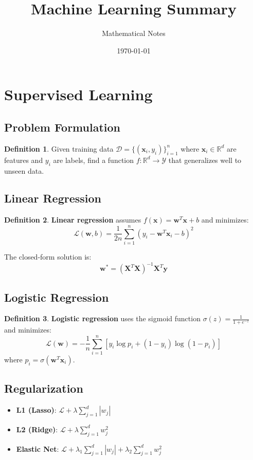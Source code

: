\documentclass[11pt]{article}
\title{Machine Learning Summary}
\author{Mathematical Notes}
\date{\today}
\theoremstyle{definition}
\newtheorem{definition}{Definition}[section]
\begin{document}
\maketitle

\tableofcontents
\newpage

\section{Supervised Learning}

\subsection{Problem Formulation}
\begin{definition}
Given training data $\mathcal{D} = \{(\mathbf{x}_i, y_i)\}_{i=1}^n$ where $\mathbf{x}_i \in \mathbb{R}^d$ are features and $y_i$ are labels, find a function $f: \mathbb{R}^d \to \mathcal{Y}$ that generalizes well to unseen data.
\end{definition}

\subsection{Linear Regression}
\begin{definition}
\textbf{Linear regression} assumes $f(\mathbf{x}) = \mathbf{w}^T\mathbf{x} + b$ and minimizes:
$$\mathcal{L}(\mathbf{w}, b) = \frac{1}{2n}\sum_{i=1}^n (y_i - \mathbf{w}^T\mathbf{x}_i - b)^2$$
\end{definition}

The closed-form solution is:
$$\mathbf{w}^* = (\mathbf{X}^T\mathbf{X})^{-1}\mathbf{X}^T\mathbf{y}$$

\subsection{Logistic Regression}
\begin{definition}
\textbf{Logistic regression} uses the sigmoid function $\sigma(z) = \frac{1}{1+e^{-z}}$ and minimizes:
$$\mathcal{L}(\mathbf{w}) = -\frac{1}{n}\sum_{i=1}^n [y_i \log p_i + (1-y_i)\log(1-p_i)]$$
where $p_i = \sigma(\mathbf{w}^T\mathbf{x}_i)$.
\end{definition}

\subsection{Regularization}
\begin{itemize}
    \item \textbf{L1 (Lasso)}: $\mathcal{L} + \lambda \sum_{j=1}^d |w_j|$
    \item \textbf{L2 (Ridge)}: $\mathcal{L} + \lambda \sum_{j=1}^d w_j^2$
    \item \textbf{Elastic Net}: $\mathcal{L} + \lambda_1 \sum_{j=1}^d |w_j| + \lambda_2 \sum_{j=1}^d w_j^2$
\end{itemize}
\end{document}
